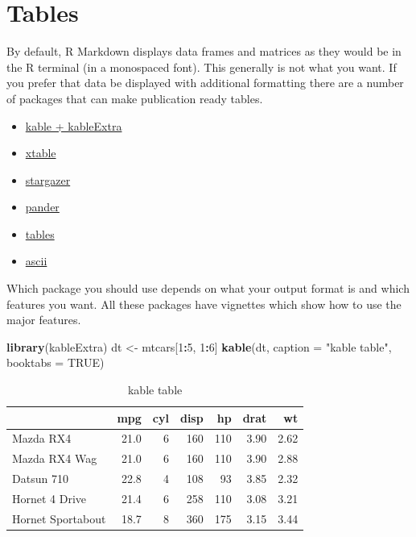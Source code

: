 \documentclass[]{book}
\newenvironment{Shaded}{\begin{snugshade}}{\end{snugshade}}
\newcommand{\DataTypeTok}[1]{\textcolor[rgb]{0.13,0.29,0.53}{#1}}
\newcommand{\DecValTok}[1]{\textcolor[rgb]{0.00,0.00,0.81}{#1}}
\newcommand{\KeywordTok}[1]{\textcolor[rgb]{0.13,0.29,0.53}{\textbf{#1}}}
\newcommand{\NormalTok}[1]{#1}
\newcommand{\OperatorTok}[1]{\textcolor[rgb]{0.81,0.36,0.00}{\textbf{#1}}}
\newcommand{\OtherTok}[1]{\textcolor[rgb]{0.56,0.35,0.01}{#1}}
\newcommand{\StringTok}[1]{\textcolor[rgb]{0.31,0.60,0.02}{#1}}
\providecommand{\tightlist}{%
  \setlength{\itemsep}{0pt}\setlength{\parskip}{0pt}}
\theoremstyle{definition}
\theoremstyle{definition}
\theoremstyle{definition}
\theoremstyle{remark}
\begin{document}
\hypertarget{tables}{%
\section{Tables}\label{tables}}

By default, R Markdown displays data frames and matrices as they would
be in the R terminal (in a monospaced font). This generally is not what
you want. If you prefer that data be displayed with additional
formatting there are a number of packages that can make publication
ready tables.

\begin{itemize}
\tightlist
\item
  \href{https://cran.r-project.org/web/packages/kableExtra/index.html}{kable
  + kableExtra}
\item
  \href{https://cran.r-project.org/web/packages/xtable/index.html}{xtable}
\item
  \href{https://cran.r-project.org/web/packages/stargazer/index.html}{stargazer}
\item
  \href{https://cran.r-project.org/web/packages/pander/index.html}{pander}
\item
  \href{https://cran.r-project.org/web/packages/tables/index.html}{tables}
\item
  \href{https://cran.r-project.org/web/packages/ascii/index.html}{ascii}
\end{itemize}

Which package you should use depends on what your output format is and
which features you want. All these packages have vignettes which show
how to use the major features.

\begin{Shaded}
\begin{Highlighting}[]
\KeywordTok{library}\NormalTok{(kableExtra)}
\NormalTok{dt <-}\StringTok{ }\NormalTok{mtcars[}\DecValTok{1}\OperatorTok{:}\DecValTok{5}\NormalTok{, }\DecValTok{1}\OperatorTok{:}\DecValTok{6}\NormalTok{]}
\KeywordTok{kable}\NormalTok{(dt, }\DataTypeTok{caption =} \StringTok{"kable table"}\NormalTok{, }\DataTypeTok{booktabs =} \OtherTok{TRUE}\NormalTok{)}
\end{Highlighting}
\end{Shaded}

\begin{table}

\caption{\label{tab:kable}kable table}
\centering
\begin{tabular}[t]{lrrrrrr}
\toprule
  & mpg & cyl & disp & hp & drat & wt\\
\midrule
Mazda RX4 & 21.0 & 6 & 160 & 110 & 3.90 & 2.62\\
Mazda RX4 Wag & 21.0 & 6 & 160 & 110 & 3.90 & 2.88\\
Datsun 710 & 22.8 & 4 & 108 & 93 & 3.85 & 2.32\\
Hornet 4 Drive & 21.4 & 6 & 258 & 110 & 3.08 & 3.21\\
Hornet Sportabout & 18.7 & 8 & 360 & 175 & 3.15 & 3.44\\
\bottomrule
\end{tabular}
\end{table}
\end{document}
